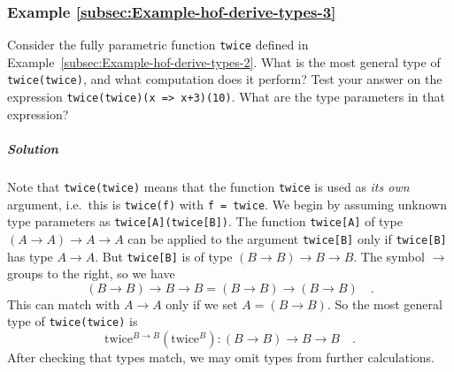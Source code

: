 \subsubsection{Example \label{subsec:Example-hof-derive-types-3}\ref{subsec:Example-hof-derive-types-3}}

Consider the fully parametric function \lstinline!twice! defined
in Example~\ref{subsec:Example-hof-derive-types-2}. What is the
most general type of \lstinline!twice(twice)!, and what computation
does it perform? Test your answer on the expression \lstinline!twice(twice)(x => x+3)(10)!.
What are the type parameters in that expression?

\subparagraph{Solution}

Note that \lstinline!twice(twice)! means that the function \lstinline!twice!
is used as \emph{its own} argument, i.e.~this is \lstinline!twice(f)!
with \lstinline!f = twice!. We begin by assuming unknown type parameters
as \lstinline!twice[A](twice[B])!. The function \lstinline!twice[A]!
of type $\left(A\rightarrow A\right)\rightarrow A\rightarrow A$ can
be applied to the argument \lstinline!twice[B]! only if \lstinline!twice[B]!
has type $A\rightarrow A$. But \lstinline!twice[B]! is of type $\left(B\rightarrow B\right)\rightarrow B\rightarrow B$.
The symbol $\rightarrow$ groups to the right, so we have
\[
\left(B\rightarrow B\right)\rightarrow B\rightarrow B=\left(B\rightarrow B\right)\rightarrow\left(B\rightarrow B\right)\quad.
\]
This can match with $A\rightarrow A$ only if we set $A=\left(B\rightarrow B\right)$.
So the most general type of \lstinline!twice(twice)! is
\begin{equation}
\text{twice}^{B\rightarrow B}(\text{twice}^{B}):\left(B\rightarrow B\right)\rightarrow B\rightarrow B\quad.\label{eq:hof-twice-example-solved3}
\end{equation}
After checking that types match, we may omit types from further calculations.

